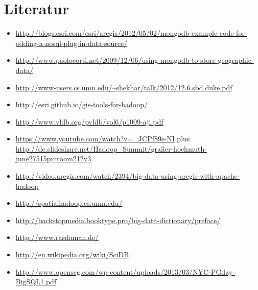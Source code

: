 \documentclass[
a4paper,     %
12pt         %
]{scrartcl}  %
\begin{document}
\section{Literatur}
\begin{itemize}
\item \url{http://blogs.esri.com/esri/arcgis/2012/05/02/mongodb-example-code-for-adding-a-nosql-plug-in-data-source/}
\item \url{http://www.paolocorti.net/2009/12/06/using-mongodb-to-store-geographic-data/}
\item \url{http://www-users.cs.umn.edu/~shekhar/talk/2012/12.6.sbd.duke.pdf}
\item \url{http://esri.github.io/gis-tools-for-hadoop/}
\item \url{http://www.vldb.org/pvldb/vol6/p1009-aji.pdf}
\item \url{https://www.youtube.com/watch?v=_JCPf89s-NI} plus \url{http://de.slideshare.net/Hadoop_Summit/grailer-hochmuth-june27515pmroom212v3}
\item \url{http://video.arcgis.com/watch/2394/big-data-using-arcgis-with-apache-hadoop}
\item \url{http://spatialhadoop.cs.umn.edu/}
\item \url{http://backstopmedia.booktype.pro/big-data-dictionary/preface/}
\item \url{http://www.rasdaman.de/}
\item \url{http://en.wikipedia.org/wiki/SciDB}
\item \url{http://www.openscg.com/wp-content/uploads/2013/03/NYC-PGday-BigSQL1.pdf}

\end{itemize}



% 

% 
\end{document}
